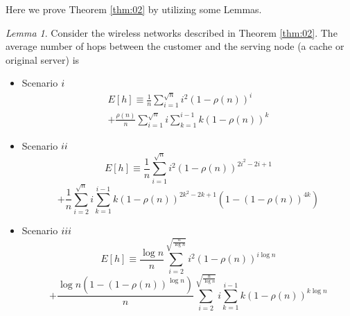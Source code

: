 \documentclass[journal]{IEEEtran}
\theoremstyle{plain}
\theoremstyle{remark}
\newtheorem{lemma}{Lemma}
\begin{document}
Here we prove Theorem \ref{thm:02} by utilizing some Lemmas.

\begin{lemma} \label{lem:01}
	Consider the wireless networks described in Theorem \ref{thm:02}. The average number of hops between the customer and the serving node (a cache or original server) is 
	
		\begin{itemize}
		\item Scenario $\romannumeral 1$
			\begin{eqnarray}
		&E[h]\equiv \frac{1}{n}\sum_{i=1}^{\sqrt{n}} i^2(1-\rho(n))^i& \nonumber \\
		&+ \frac{\rho(n)}{n}\sum_{i=1}^{\sqrt{n}}i\sum_{k=1}^{i-1}k(1-\rho(n))^k& \label{eq:EXi}
	\end{eqnarray}

		\item Scenario $\romannumeral 2$
		\begin{equation}
		E[h]\equiv \frac{1}{n}\sum_{i=1}^{\sqrt{n}} i^2(1-\rho(n))^{2i^2-2i+1} \nonumber 
		\end{equation}
		\begin{equation}
		+ \frac{1}{n}\sum_{i=2}^{\sqrt{n}}i\sum_{k=1}^{i-1}k(1-\rho(n))^{2k^2-2k+1}(1-(1-\rho(n))^{4k}) \label{eq:EXii}
	  \end{equation}
		
		\item Scenario $\romannumeral 3$
		\begin{equation}
		E[h]\equiv \frac{\log n}{n}\sum_{i=2}^{\sqrt{\frac{n}{\log n}}} i^2(1-\rho(n))^{i\log n} \nonumber 
		\end{equation}
		\begin{equation}
		+ \frac{\log n(1-(1-\rho(n))^{\log n})}{n}\sum_{i=2}^{\sqrt{\frac{n}{\log n}}}i\sum_{k=1}^{i-1}k(1-\rho(n))^{k\log n} \label{eq:EXiii}
	\end{equation}
	
		\end{itemize}
	\end{lemma}
	
\end{document}
